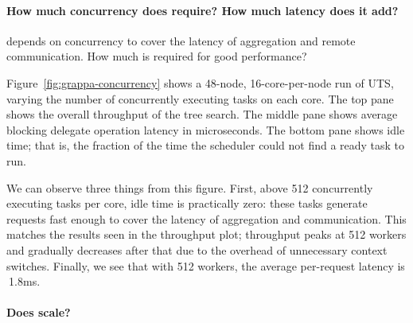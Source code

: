 \paragraph{How much concurrency does \Grappa require? How much latency does it add?}
\Grappa depends on concurrency to cover the latency of aggregation and
remote communication. How much is required for good performance?

Figure~\ref{fig:grappa-concurrency} shows a 48-node, 16-core-per-node
run of UTS, varying the number of concurrently executing tasks on each
core. The top pane shows the overall throughput of the tree search.
The middle pane shows average blocking delegate operation latency in
microseconds. The bottom pane shows idle time; that is, the fraction
of the time the scheduler could not find a ready task to run.

We can observe three things from this figure. First, above 512
concurrently executing tasks per core, idle time is practically zero:
these tasks generate requests fast enough to cover the latency of
aggregation and communication. This matches the results seen in the
throughput plot; throughput peaks at 512 workers and gradually
decreases after that due to the overhead of unnecessary context
switches. Finally, we see that with 512 workers, the average
per-request latency is $~$1.8ms.

\paragraph{Does \Grappa scale?}


